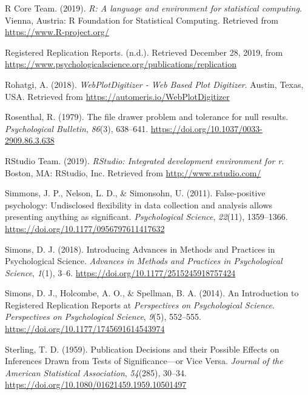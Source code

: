 \documentclass[british,,jou,floatsintext]{apa6}
\begin{document}
\leavevmode\hypertarget{ref-R-base}{}%
R Core Team. (2019). \emph{R: A language and environment for statistical computing}. Vienna, Austria: R Foundation for Statistical Computing. Retrieved from \url{https://www.R-project.org/}

\leavevmode\hypertarget{ref-RRRwebsite}{}%
Registered Replication Reports. (n.d.). Retrieved December 28, 2019, from \url{https://www.psychologicalscience.org/publications/replication}

\leavevmode\hypertarget{ref-Rohatgi2018}{}%
Rohatgi, A. (2018). \emph{WebPlotDigitizer - Web Based Plot Digitizer}. Austin, Texas, USA. Retrieved from \url{https://automeris.io/WebPlotDigitizer}

\leavevmode\hypertarget{ref-Rosenthal1979}{}%
Rosenthal, R. (1979). The file drawer problem and tolerance for null results. \emph{Psychological Bulletin}, \emph{86}(3), 638--641. \url{https://doi.org/10.1037/0033-2909.86.3.638}

\leavevmode\hypertarget{ref-RStudioTeam2019}{}%
RStudio Team. (2019). \emph{RStudio: Integrated development environment for r}. Boston, MA: RStudio, Inc. Retrieved from \url{http://www.rstudio.com/}

\leavevmode\hypertarget{ref-Simmons2011}{}%
Simmons, J. P., Nelson, L. D., \& Simonsohn, U. (2011). False-positive psychology: Undisclosed flexibility in data collection and analysis allows presenting anything as significant. \emph{Psychological Science}, \emph{22}(11), 1359--1366. \url{https://doi.org/10.1177/0956797611417632}

\leavevmode\hypertarget{ref-Simons2018}{}%
Simons, D. J. (2018). Introducing Advances in Methods and Practices in Psychological Science. \emph{Advances in Methods and Practices in Psychological Science}, \emph{1}(1), 3--6. \url{https://doi.org/10.1177/2515245918757424}

\leavevmode\hypertarget{ref-Simons2014}{}%
Simons, D. J., Holcombe, A. O., \& Spellman, B. A. (2014). An Introduction to Registered Replication Reports at \emph{Perspectives} \emph{on} \emph{Psychological Science}. \emph{Perspectives on Psychological Science}, \emph{9}(5), 552--555. \url{https://doi.org/10.1177/1745691614543974}

\leavevmode\hypertarget{ref-Sterling1959}{}%
Sterling, T. D. (1959). Publication Decisions and their Possible Effects on Inferences Drawn from Tests of Significance---or Vice Versa. \emph{Journal of the American Statistical Association}, \emph{54}(285), 30--34. \url{https://doi.org/10.1080/01621459.1959.10501497}
\end{document}
